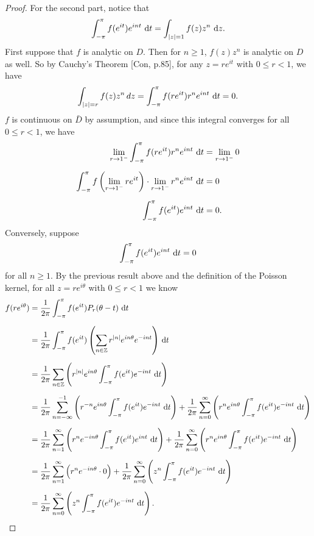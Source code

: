 \documentclass[11pt,oneside,english]{amsart}
\theoremstyle{definition}
\newcommand{\MB}[1]{\mathbb{#1}}
\begin{document}
\begin{enumerate}[leftmargin=*]
\begin{proof}
For the second part, notice that
\[
\int_{-\pi}^\pi f(e^{it})e^{int}\,\dif{t}=\int_{|z|=1} f(z)z^n\,\dif{z}.
\]
First suppose that $f$ is analytic on $D$. Then for $n\geq1$, $f(z)z^n$ is analytic on $D$ as well. So by Cauchy's Theorem [Con, p.85], for any $z=re^{it}$ with $0\leq r<1$, we have
\[
\int_{|z|=r}f(z)z^n\,dz=\int_{-\pi}^\pi f(re^{it})r^ne^{int}\,\dif{t}=0.
\]
$f$ is continuous on $\bar D$ by assumption, and since this integral converges for all $0\leq r<1$, we have
\begin{align*}
\lim_{r\to1^-}\int_{-\pi}^\pi f(re^{it})r^ne^{int}\,\dif{t}&=\lim_{r\to1^-}0\\[2mm]
\int_{-\pi}^\pi f\left(\lim_{r\to1^-}re^{it}\right)\cdot\lim_{r\to1^-}r^ne^{int}\,\dif{t}&=0\\[2mm]
\int_{-\pi}^\pi f(e^{it})e^{int}\,\dif{t}&=0.
\end{align*}
Conversely, suppose 
\[
\int_{-\pi}^\pi f(e^{it})e^{int}\,\dif{t}=0
\]
for all $n\geq 1$. By the previous result above and the definition of the Poisson kernel, for all $z=re^{i\theta}$ with $0\leq r<1$ we know 
\begin{align*}
f(re^{i\theta})&=\frac{1}{2\pi}\int_{-\pi}^\pi f(e^{it})P_r(\theta-t)\,\dif{t}\\[2mm]
&=\frac{1}{2\pi}\int_{-\pi}^\pi f(e^{it})\left(\sum_{n\in\MB{Z}}r^{|n|}e^{in\theta}e^{-int}\right)\,\dif{t}\\[2mm]
&=\frac{1}{2\pi}\sum_{n\in\MB{Z}}\left(r^{|n|}e^{in\theta}\int_{-\pi}^\pi f(e^{it})e^{-int}\,\dif{t}\right)\\[2mm]
&=\frac{1}{2\pi}\sum_{n=-\infty}^{-1}\left(r^{-n}e^{in\theta}\int_{-\pi}^\pi f(e^{it})e^{-int}\,\dif{t}\right)+\frac{1}{2\pi}\sum_{n=0}^\infty\left(r^{n}e^{in\theta}\int_{-\pi}^\pi f(e^{it})e^{-int}\,\dif{t}\right)\\[2mm]
&=\frac{1}{2\pi}\sum_{n=1}^{\infty}\left(r^{n}e^{-in\theta}\int_{-\pi}^\pi f(e^{it})e^{int}\,\dif{t}\right)+\frac{1}{2\pi}\sum_{n=0}^\infty\left(r^{n}e^{in\theta}\int_{-\pi}^\pi f(e^{it})e^{-int}\,\dif{t}\right)\\[2mm]
&=\frac{1}{2\pi}\sum_{n=1}^{\infty}\left(r^{n}e^{-in\theta}\cdot0\right)+\frac{1}{2\pi}\sum_{n=0}^\infty\left(z^n\int_{-\pi}^\pi f(e^{it})e^{-int}\,\dif{t}\right)\\[2mm]
&=\frac{1}{2\pi}\sum_{n=0}^\infty\left(z^n\int_{-\pi}^\pi f(e^{it})e^{-int}\,\dif{t}\right).
\end{align*}


\end{proof}
\end{enumerate}
\end{document}
